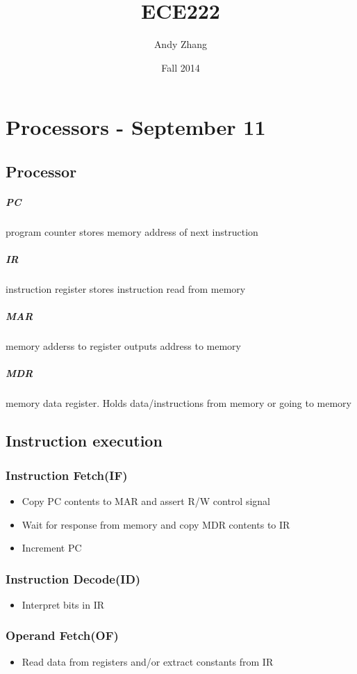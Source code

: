 \documentclass[12pt]{report}
\title{ECE222}
\author{{Andy Zhang}}
\date{{Fall 2014}}
\begin{document}
\chapter{Processors - September 11}
  \section{Processor}
    \paragraph{PC} program counter stores memory address of next instruction
    \paragraph{IR} instruction register stores instruction read from memory
    \paragraph{MAR} memory adderss to register outputs address to memory
    \paragraph{MDR} memory data register. Holds data/instructions from memory
    or going to memory
  \section{Instruction execution}
    \subsection{Instruction Fetch(IF)}
      \begin{itemize}
        \item Copy PC contents to MAR and assert R/W control signal
        \item Wait for response from memory and copy MDR contents to IR
        \item Increment PC
      \end{itemize}
    \subsection{Instruction Decode(ID)}
      \begin{itemize}
        \item Interpret bits in IR
      \end{itemize}
    \subsection{Operand Fetch(OF)}
      \begin{itemize}
        \item Read data from registers and/or extract constants from IR
      \end{itemize}
\end{document}
